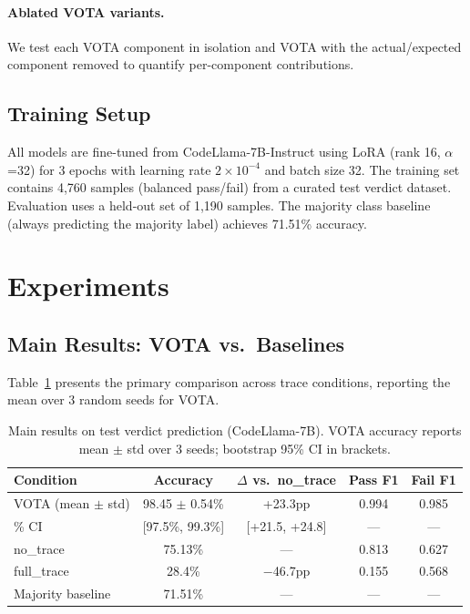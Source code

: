 \documentclass[11pt]{article}
\begin{document}
\paragraph{Ablated VOTA variants.} We test each VOTA component in isolation and VOTA with the actual/expected component removed to quantify per-component contributions.

\subsection{Training Setup}

All models are fine-tuned from CodeLlama-7B-Instruct using LoRA (rank 16, $\alpha$=32) for 3 epochs with learning rate $2 \times 10^{-4}$ and batch size 32. The training set contains 4,760 samples (balanced pass/fail) from a curated test verdict dataset. Evaluation uses a held-out set of 1,190 samples. The majority class baseline (always predicting the majority label) achieves 71.51\% accuracy.

\section{Experiments}

\subsection{Main Results: VOTA vs.\ Baselines}
\label{sec:main}

Table~\ref{tab:main} presents the primary comparison across trace conditions, reporting the mean over 3 random seeds for VOTA.

\begin{table}[h]
\centering
\caption{Main results on test verdict prediction (CodeLlama-7B). VOTA accuracy reports mean $\pm$ std over 3 seeds; bootstrap 95\% CI in brackets.}
\label{tab:main}
\begin{tabular}{lcccc}
\toprule
\textbf{Condition} & \textbf{Accuracy} & \textbf{$\Delta$ vs.\ no\_trace} & \textbf{Pass F1} & \textbf{Fail F1} \\
\midrule
VOTA (mean $\pm$ std) & 98.45 $\pm$ 0.54\% & +23.3pp & 0.994 & 0.985 \\
\quad 95\% CI & [97.5\%, 99.3\%] & [+21.5, +24.8] & --- & --- \\
no\_trace & 75.13\% & --- & 0.813 & 0.627 \\
full\_trace & 28.4\% & $-$46.7pp & 0.155 & 0.568 \\
\midrule
Majority baseline & 71.51\% & --- & --- & --- \\
\bottomrule
\end{tabular}
\end{table}
\end{document}
